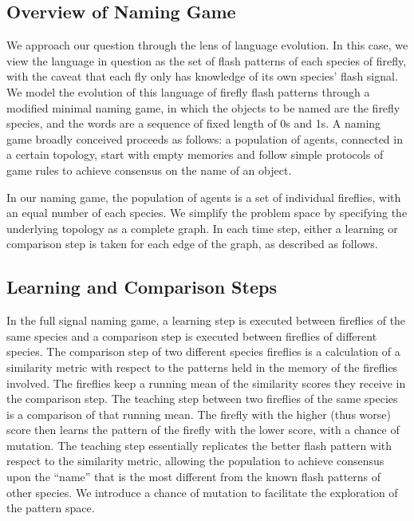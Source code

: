 

\subsection{Overview of Naming Game}
We approach our question through the lens of language evolution. In this case, we view the language in question as the set of flash patterns of each species of firefly, with the caveat that each fly only has knowledge of its own species' flash signal. 
We model the evolution of this language of firefly flash patterns through a modified minimal naming game, in which the objects to be named are the firefly species, and the words are a sequence of fixed length of 0s and 1s.
A naming game broadly conceived proceeds as follows: a population of agents, connected in a certain topology, start with empty memories and follow simple protocols of game rules to achieve consensus on the name of an object. 

In our naming game, the population of agents is a set of individual fireflies, with an equal number of each species.
We simplify the problem space by specifying the underlying topology as a complete graph. 
In each time step, either a learning or comparison step is taken for each edge of the graph, as described as follows.

\subsection{Learning and Comparison Steps}
In the full signal naming game, a learning step is executed between fireflies of the same species and a comparison step is executed between fireflies of different species. 
The comparison step of two different species fireflies is a calculation of a similarity metric with respect to the patterns held in the memory of the fireflies involved. The fireflies keep a running mean of the similarity scores they receive in the comparison step.
The teaching step between two fireflies of the same species is a comparison of that running mean. The firefly with the higher (thus worse) score then learns the pattern of the firefly with the lower score, with a chance of mutation. 
The teaching step essentially replicates the better flash pattern with respect to the similarity metric, allowing the population to achieve consensus upon the ``name'' that is the most different from the known flash patterns of other species. 
We introduce a chance of mutation to facilitate the exploration of the pattern space. 

